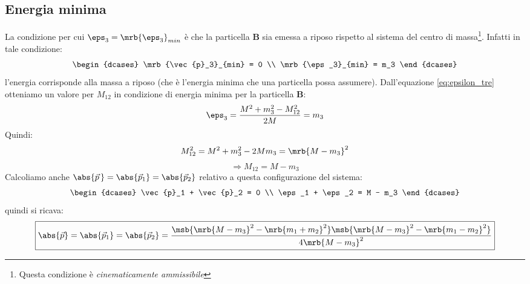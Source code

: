 \subsection{Energia minima}
La condizione per cui $\eps_3 = \mrb{\eps_3}_{min}$ è che la
particella $\boldsymbol{B}$ sia emessa a riposo rispetto al sistema del centro
di massa\footnote{
	Questa condizione è \textit{cinematicamente ammissibile}
}. Infatti in tale condizione:
\begin{equation}
	\begin{dcases}
		\mrb{\vec{p}_3}_{min} = 0
		\\
		\mrb{\eps_3}_{min} = m_3
	\end{dcases}
\end{equation}
l'energia corrisponde alla massa a riposo (che è l'energia minima che una
particella possa assumere). Dall'equazione \ref{eq:epsilon_tre} otteniamo un
valore per $M_{12}$ in condizione di energia minima per la particella
$\boldsymbol{B}$:
\begin{equation}
	\eps_3 = \frac{M^2 + m_3^2 - M_{12}^2}{2 M} = m_3
\end{equation}
Quindi:
\begin{equation}
	M_{12}^2 =  M^2 + m_3^2 - 2 M m_3 = \mrb{M - m_3}^2
\end{equation}
\begin{equation}
	\Rightarrow \boxed{M_{12} = M - m_3}
\end{equation}
Calcoliamo anche $\abs{\vec{p}\,} = \abs{\vec{p}_1} = \abs{\vec{p}_2}$ relativo
a questa configurazione del sistema:
\begin{equation}
	\begin{dcases}
		\vec{p}_1 + \vec{p}_2 = 0
		\\
		\eps_1 + \eps_2 = M - m_3
	\end{dcases}
\end{equation}
quindi si ricava:
\begin{equation}
	\boxed{
		\abs{\vec{p}}
		= \abs{\vec{p}_1}
		= \abs{\vec{p}_2}
		= \frac{
			\msb{\mrb{M - m_3}^2 - \mrb{m_1 + m_2}^2}
			\msb{\mrb{M - m_3}^2 - \mrb{m_1 - m_2}^2}
		}{4 \mrb{M - m_3}^2}
	}
\end{equation}

